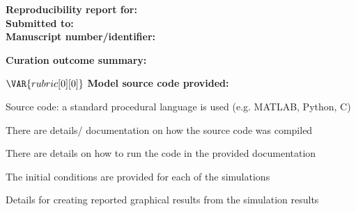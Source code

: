 \documentclass{article}
\date{}
\newcommand{\absent}{\raisebox{0pt}{\tikz{\node[draw,scale=0.7,regular polygon, regular polygon sides=4,fill=none](){};}}}
\newcommand{\present}{\raisebox{0pt}{\tikz{\node[draw,scale=0.7,regular polygon, regular polygon sides=4,fill=black!20!Cerulean](){};}}}
\begin{document}
\noindent
\textbf{Reproducibility report for:} 
\\
\textbf{Submitted to:} 
\\
\textbf{Manuscript number/identifier:} 

\bigskip
\noindent
\textbf{Curation outcome summary:} 
\vspace{5mm}
\begin{tcolorbox}[breakable,height fill,
colback=white,
arc=0pt,
outer arc=0pt,
colframe=white,
top=2mm,
toptitle=2mm,
bottomtitle=2mm,
colbacktitle=white!80!black,
colframe=black,
coltitle=black, 
title= \textbf{Box 1:} Criteria for repeatability and reproducibility]
$\VAR{rubric[0][0]}$ \textbf{Model source code provided:}
\begin{todolist}
  \item [\present] Source code: a standard procedural language is used (e.g. MATLAB, Python, C)
  \begin{todolist}
      \item[\present] There are details/ documentation on how the source code was compiled
      \item[\absent] There are details on how to run the code in the provided documentation
      \item[\absent] The initial conditions are provided for each of the simulations
      \item[\absent] Details for creating reported graphical results from the simulation results
  \end{todolist}
  

\end{todolist}
\end{tcolorbox}
\end{document}
